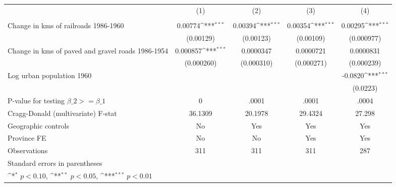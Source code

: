 {
\def\sym#1{\ifmmode^{#1}\else\(^{#1}\)\fi}
\begin{tabular}{l*{4}{c}}
\hline\hline
                &\multicolumn{1}{c}{(1)}&\multicolumn{1}{c}{(2)}&\multicolumn{1}{c}{(3)}&\multicolumn{1}{c}{(4)}\\
                &\multicolumn{1}{c}{}&\multicolumn{1}{c}{}&\multicolumn{1}{c}{}&\multicolumn{1}{c}{}\\
\hline
Change in kms of railroads 1986-1960&  0.00774\sym{***}&  0.00394\sym{***}&  0.00354\sym{***}&  0.00295\sym{***}\\
                &(0.00129)         &(0.00123)         &(0.00109)         &(0.000977)         \\
[1em]
Change in kms of paved and gravel roads 1986-1954& 0.000857\sym{***}&0.0000347         &0.0000721         &0.0000831         \\
                &(0.000260)         &(0.000310)         &(0.000271)         &(0.000239)         \\
[1em]
Log urban population 1960&                  &                  &                  &  -0.0820\sym{***}\\
                &                  &                  &                  & (0.0223)         \\
\hline
P-value for testing $\beta\_{2} >= \beta\_{1}$&        0         &    .0001         &    .0001         &    .0004         \\
Cragg-Donald (multivariate) F-stat&  36.1309         &  20.1978         &  29.4324         &   27.298         \\
Geographic controls&       No         &      Yes         &      Yes         &      Yes         \\
Province FE     &       No         &       No         &      Yes         &      Yes         \\
Observations    &      311         &      311         &      311         &      287         \\
\hline\hline
\multicolumn{5}{l}{\footnotesize Standard errors in parentheses}\\
\multicolumn{5}{l}{\footnotesize \sym{*} \(p<0.10\), \sym{**} \(p<0.05\), \sym{***} \(p<0.01\)}\\
\end{tabular}
}
